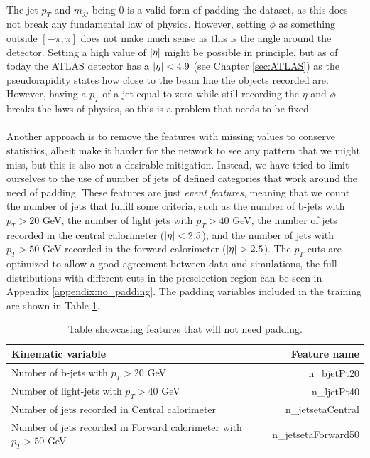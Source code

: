 \documentclass[12pt, a4paper]{book}
\begin{document}
\\The jet $p_T$ and $m_{jj}$ being 0 is a valid form of padding the dataset, as this does not break any fundamental law of physics. However, setting $\phi$ as something outside $[-\pi,\pi]$ does not make much sense 
as this is the angle around the detector. Setting a high value of $\abs{\eta}$ might be possible in principle, but as of today the ATLAS detector has a $\abs{\eta}<4.9$ (see Chapter \ref{sec:ATLAS}) as the pseudorapidity 
states how close to the beam line the objects recorded are. However, having a $p_T$ of a jet equal to zero while still recording the $\eta$ and $\phi$ breaks the laws of physics, so this is a problem that needs to be fixed.\\
\\Another approach is to remove the features with missing values to conserve statistics, albeit make it harder for the network to see any pattern that we might miss, but this is also not a desirable mitigation. 
Instead, we have tried to limit ourselves to the use of number of jets of defined categories that work around the need of padding. These features are just \textit{event features}, meaning that we count the number of jets that fulfill some criteria, 
such as the number of b-jets with $p_T > 20$ GeV, the number of light jets with $p_T>40$ GeV, the number of jets recorded in the central calorimeter ($\abs{\eta} < 2.5$), and the number of 
jets with $p_T>50$ GeV recorded in the forward calorimeter ($\abs{\eta} > 2.5$). The $p_T$ cuts are optimized to allow a good agreement between data and simulations, the full distributions with different cuts in the preselection region can be seen in Appendix \ref{appendix:no_padding}. 
The padding variables included in the training are shown in Table \ref{tab:padding_variables}.\\
\begin{table}[!h]
   \centering
   \caption[New features that need no padding]{Table showcasing features that will not need padding.}
   \begin{tabular}{l|r}\midrule\midrule
      Kinematic variable                                                      & Feature name          \\\midrule
      Number of b-jets with $p_T > 20$ GeV                                    & n\_bjetPt20\\
      Number of light-jets with $p_T > 40$ GeV                                & n\_ljetPt40\\
      Number of jets recorded in Central calorimeter                          &n\_jetsetaCentral\\
      Number of jets recorded in Forward calorimeter with $p_T > 50$ GeV      & n\_jetsetaForward50\\\midrule\midrule
   \end{tabular}
   \label{tab:padding_variables}
\end{table}
\end{document}
